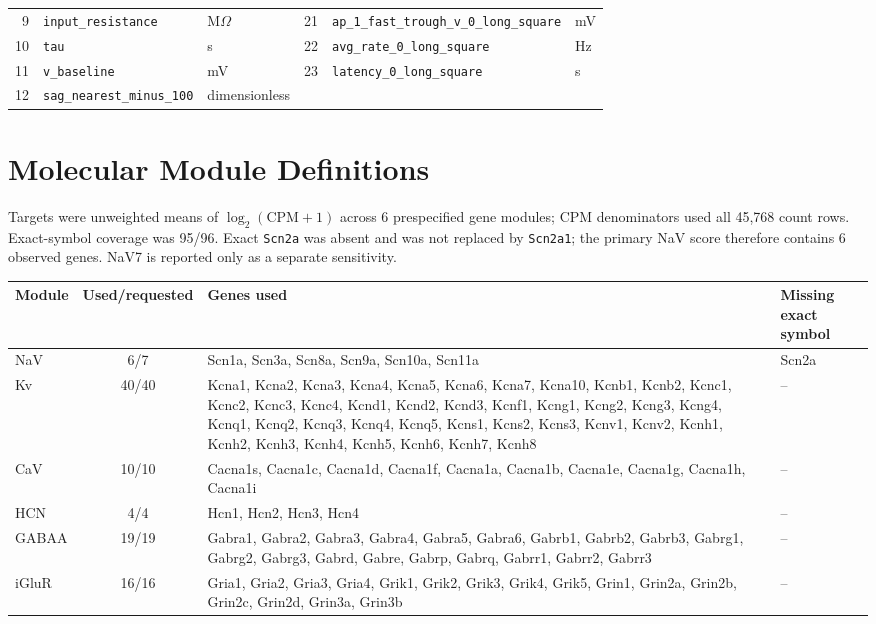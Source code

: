 \documentclass[11pt]{article}
\newcommand{\tablefont}{\fontsize{9.5}{11.2}\selectfont}
\newcommand{\sourcecaption}[1]{\Needspace{10\baselineskip}\vspace{2pt}{\small\bfseries #1}\par\vspace{2pt}}
\begin{document}
\begin{center}
\begin{tabularx}{\linewidth}{@{}rYlrYl@{}}
9 & \texttt{input\_\allowbreak{}resistance} & M$\Omega$ & 21 & \texttt{ap\_\allowbreak{}1\_\allowbreak{}fast\_\allowbreak{}trough\_\allowbreak{}v\_\allowbreak{}0\_\allowbreak{}long\_\allowbreak{}square} & mV \\
10 & \texttt{tau} & s & 22 & \texttt{avg\_\allowbreak{}rate\_\allowbreak{}0\_\allowbreak{}long\_\allowbreak{}square} & Hz \\
11 & \texttt{v\_\allowbreak{}baseline} & mV & 23 & \texttt{latency\_\allowbreak{}0\_\allowbreak{}long\_\allowbreak{}square} & s \\
12 & \texttt{sag\_\allowbreak{}nearest\_\allowbreak{}minus\_\allowbreak{}100} & dimensionless &  & &  \\
\bottomrule
\end{tabularx}
\end{center}

\section{Molecular Module Definitions}
Targets were unweighted means of $\log_2(\mathrm{CPM}+1)$ across 6 prespecified gene modules; CPM denominators used all 45,768 count rows. Exact-symbol coverage was 95/96. Exact \texttt{Scn2a} was absent and was not replaced by \texttt{Scn2a1}; the primary NaV score therefore contains 6 observed genes. NaV7 is reported only as a separate sensitivity.

\sourcecaption{Gene-module definitions and exact-symbol coverage (Tables S5--S6).}
\begin{center}\tablefont
\begin{tabularx}{\linewidth}{@{}lcYl@{}}
\toprule
Module & Used/requested & Genes used & Missing exact symbol \\
\midrule
NaV & 6/7 & Scn1a, Scn3a, Scn8a, Scn9a, Scn10a, Scn11a & Scn2a \\
Kv & 40/40 & Kcna1, Kcna2, Kcna3, Kcna4, Kcna5, Kcna6, Kcna7, Kcna10, Kcnb1, Kcnb2, Kcnc1, Kcnc2, Kcnc3, Kcnc4, Kcnd1, Kcnd2, Kcnd3, Kcnf1, Kcng1, Kcng2, Kcng3, Kcng4, Kcnq1, Kcnq2, Kcnq3, Kcnq4, Kcnq5, Kcns1, Kcns2, Kcns3, Kcnv1, Kcnv2, Kcnh1, Kcnh2, Kcnh3, Kcnh4, Kcnh5, Kcnh6, Kcnh7, Kcnh8 & -- \\
CaV & 10/10 & Cacna1s, Cacna1c, Cacna1d, Cacna1f, Cacna1a, Cacna1b, Cacna1e, Cacna1g, Cacna1h, Cacna1i & -- \\
HCN & 4/4 & Hcn1, Hcn2, Hcn3, Hcn4 & -- \\
GABAA & 19/19 & Gabra1, Gabra2, Gabra3, Gabra4, Gabra5, Gabra6, Gabrb1, Gabrb2, Gabrb3, Gabrg1, Gabrg2, Gabrg3, Gabrd, Gabre, Gabrp, Gabrq, Gabrr1, Gabrr2, Gabrr3 & -- \\
iGluR & 16/16 & Gria1, Gria2, Gria3, Gria4, Grik1, Grik2, Grik3, Grik4, Grik5, Grin1, Grin2a, Grin2b, Grin2c, Grin2d, Grin3a, Grin3b & -- \\
\bottomrule
\end{tabularx}
\end{center}
\end{document}
